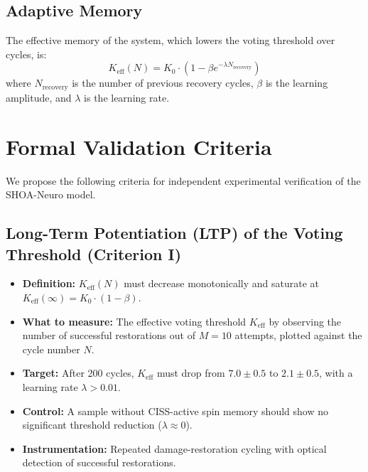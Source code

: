 \documentclass[12pt]{article}
\begin{document}
\subsection{Adaptive Memory}
The effective memory of the system, which lowers the voting threshold over cycles, is:
\begin{equation}
K_{\text{eff}}(N) = K_0 \cdot \left(1 - \beta e^{-\lambda N_{\text{recovery}}} \right)
\end{equation}
where $N_{\text{recovery}}$ is the number of previous recovery cycles, $\beta$ is the learning amplitude, and $\lambda$ is the learning rate.

\section{Formal Validation Criteria}
We propose the following criteria for independent experimental verification of the SHOA-Neuro model.

\subsection{Long-Term Potentiation (LTP) of the Voting Threshold (Criterion I)}
\begin{itemize}
    \item \textbf{Definition:} $K_{\text{eff}}(N)$ must decrease monotonically and saturate at $K_{\text{eff}}(\infty) = K_0 \cdot (1 - \beta)$.
    \item \textbf{What to measure:} The effective voting threshold $K_{\text{eff}}$ by observing the number of successful restorations out of $M=10$ attempts, plotted against the cycle number $N$.
    \item \textbf{Target:} After 200 cycles, $K_{\text{eff}}$ must drop from $7.0 \pm 0.5$ to $2.1 \pm 0.5$, with a learning rate $\lambda > 0.01$.
    \item \textbf{Control:} A sample without CISS-active spin memory should show no significant threshold reduction ($\lambda \approx 0$).
    \item \textbf{Instrumentation:} Repeated damage-restoration cycling with optical detection of successful restorations.
\end{itemize}
\end{document}
